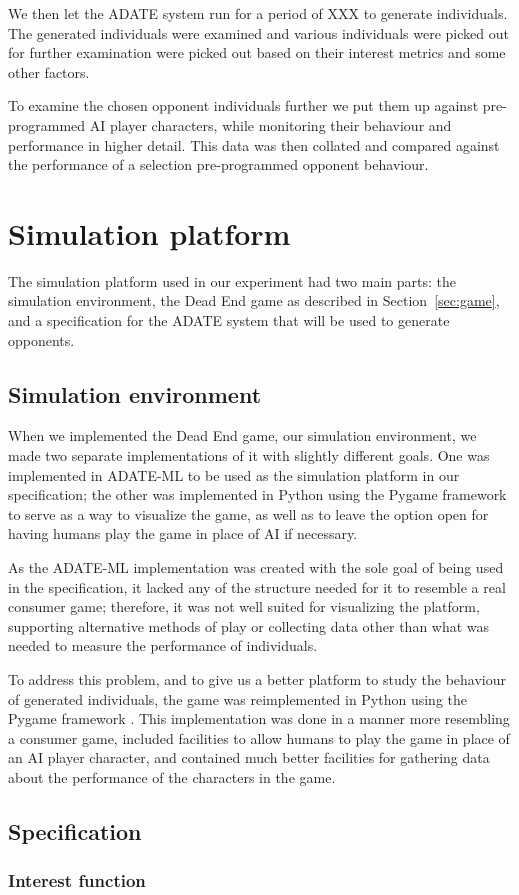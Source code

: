 We then let the ADATE system run for a period of XXX
to generate individuals. The generated individuals were examined and various
individuals were picked out for further examination were picked out based on
their interest metrics and some other factors.

To examine the chosen opponent individuals further we put them up against pre-
programmed AI player characters, while monitoring their behaviour and
performance in higher detail. This data was then collated and compared against
the performance of a selection pre-programmed opponent behaviour.

\section{Simulation platform}
\label{sec:sim-platform}

The simulation platform used in our experiment had two main parts: the
simulation environment, the Dead End game as described in
Section~\ref{sec:game}, and a specification for the ADATE system that will be
used to generate opponents.

\subsection{Simulation environment}
\label{sec:sim-environment}

When we implemented the Dead End game, our simulation environment, we made two
separate implementations of it with slightly different goals. One was
implemented in ADATE-ML to be used as the simulation platform in our
specification; the other was implemented in Python using the Pygame framework
\citep{pygame} to serve as a way to visualize the game, as well as to leave the
option open for having humans play the game in place of AI if necessary.

As the ADATE-ML implementation was created with the sole goal of being used in
the specification, it lacked any of the structure needed for it to resemble a
real consumer game; therefore, it was not well suited for visualizing the
platform, supporting alternative methods of play or collecting data other than
what was needed to measure the performance of individuals.

 To address this problem, and to give us a
better platform to study the behaviour of generated individuals, the game was
reimplemented in Python using the Pygame framework \citep{pygame}. This
implementation was done in a manner more resembling a consumer game, included
facilities to allow humans to play the game in place of an AI player character,
and contained much better facilities for gathering data about the performance of
the characters in the game.

\subsection{Specification}
\label{sec:specification}

\subsubsection{Interest function}




